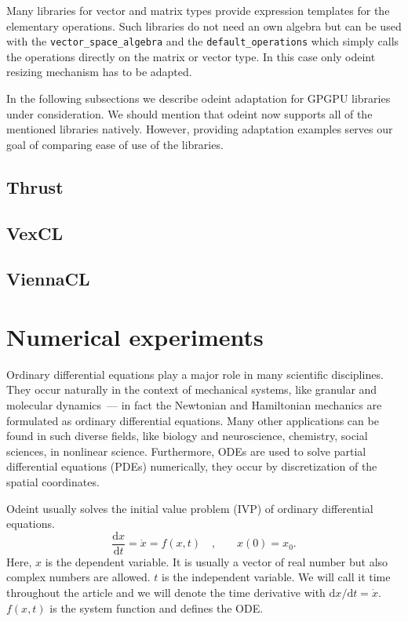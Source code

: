 \documentclass[1p]{elsarticle}
\newcommand{\code}[1]{\lstinline|#1|}
\newcommand {\de} {\mbox{d}}
\begin{document}

Many libraries for vector and matrix types provide expression templates for the
elementary operations. Such libraries do not need an own algebra but can be
used with the \code{vector_space_algebra} and the \code{default_operations}
which simply calls the operations directly on the matrix or vector type. In
this case only odeint resizing mechanism has to be adapted.

In the following subsections we describe odeint adaptation for GPGPU libraries
under consideration. We should mention that odeint now supports all of the
mentioned libraries natively. However, providing adaptation examples serves our
goal of comparing ease of use of the libraries.

\subsection{Thrust}
\subsection{VexCL}
\subsection{ViennaCL}














\section{Numerical experiments}

Ordinary differential equations play a major role in many scientific
disciplines. They occur naturally in the context of mechanical
systems, like granular and molecular dynamics~--- in fact the Newtonian
and Hamiltonian mechanics are formulated as ordinary differential
equations. Many other applications can be found in such diverse
fields, like biology and neuroscience, chemistry, social sciences, in
nonlinear science. Furthermore, ODEs are used to solve partial
differential equations (PDEs) numerically, they occur by discretization of
the spatial coordinates.

Odeint usually solves the initial value problem (IVP) of ordinary differential
equations.
\begin{equation}
\frac{\de x}{\de t } = \dot{x} = f(x , t) \quad \text{,} \quad \quad x(0) =
x_0.
\label{eq:ode}
\end{equation}
Here, $x$ is the dependent variable. It is usually a vector of real
number but also complex numbers are allowed. $t$ is the independent
variable. We will call it time throughout the article and we will
denote the time derivative with $\de x / \de t = \dot{x}$. $f(x,t)$
is the system function and defines the ODE.
\end{document}
